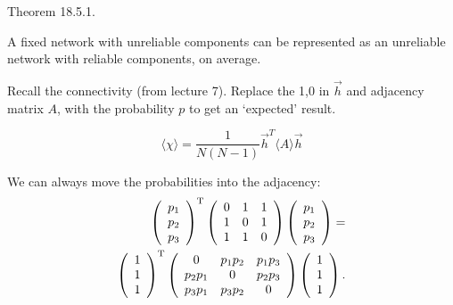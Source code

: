 \documentclass{slides}
\begin{document}

Theorem 18.5.1.

A fixed network with unreliable components can be represented as an unreliable
network with reliable components, on average.

Recall the connectivity (from lecture 7). Replace the 1,0 in $\vec h$ and adjacency
matrix $A$, with the probability $p$ to get an `expected' result.

$$
\langle\chi\rangle = \frac{1}{N(N-1)}{\vec h}^T \langle A \rangle \vec h
$$


We can always move the probabilities into the adjacency:
\begin{eqnarray}
  \left (
    \begin{array}{c}
      p_1 \\ 
      p_2 \\ 
      p_3 \\ 
    \end{array}
  \right )^{\rm T}
\left (
    \begin{array}{cccc}
      0 & 1 & 1  \\ 
      1 & 0 & 1  \\ 
      1 & 1 & 0  \\
    \end{array}
  \right )
  \left (
    \begin{array}{c}
      p_1 \\ 
      p_2 \\ 
      p_3 \\ 
    \end{array}
  \right )
=\nonumber\\
  \left (
    \begin{array}{c}
      1 \\ 
      1 \\ 
      1 \\ 
    \end{array}
  \right )^{\rm T}
\left (
    \begin{array}{cccc}
      0 & p_1p_2 & p_1p_3  \\ 
      p_2p_1 & 0 & p_2p_3  \\ 
      p_3p_1 & p_3p_2 & 0  \\
    \end{array}
  \right )
  \left (
    \begin{array}{c}
      1 \\ 
      1 \\ 
      1 \\ 
    \end{array}
  \right ).\nonumber 
\end{eqnarray}
\end{document}
